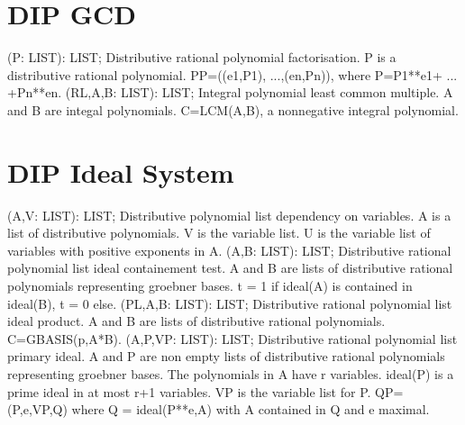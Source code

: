 \section{ DIP GCD  } 
 (P: LIST): LIST; \eproc
\bcom Distributive rational polynomial factorisation.
P is a distributive rational polynomial.
PP=((e1,P1), ...,(en,Pn)), where P=P1**e1+ ... +Pn**en.  \ecom 
{} (RL,A,B: LIST): LIST; \eproc
\bcom Integral polynomial least common multiple. A and B are integal
polynomials. C=LCM(A,B), a nonnegative integral polynomial. \ecom 
\section{ DIP Ideal System  } 
 (A,V: LIST): LIST; \eproc
\bcom Distributive polynomial list dependency on variables.
A is a list of distributive polynomials. V is the variable list.
U is the variable list of variables with positive exponents in A.  \ecom 
{} (A,B: LIST): LIST; \eproc
\bcom Distributive rational polynomial list ideal containement test.
A and B are lists of distributive rational polynomials representing 
groebner bases. t = 1 if ideal(A) is contained in ideal(B),
t = 0 else.  \ecom 
{} (PL,A,B: LIST): LIST; \eproc
\bcom Distributive rational polynomial list ideal product.
A and B are lists of distributive rational polynomials. 
C=GBASIS(p,A*B). \ecom 
{} (A,P,VP: LIST): LIST; \eproc
\bcom Distributive rational polynomial list primary ideal.
A and P are non empty lists of distributive rational polynomials 
representing groebner bases. The polynomials in A have r variables.
ideal(P) is a prime ideal in at most r+1 variables. VP is the 
variable list for P. QP=(P,e,VP,Q) where Q = ideal(P**e,A) 
with A contained in Q and e maximal.  \ecom 

